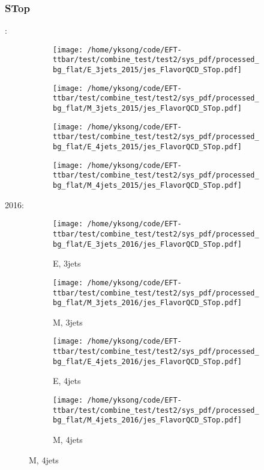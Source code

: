 \documentclass{beamer}
\begin{document}
\begin{frame}
\frametitle{STop}
\fontsize{5}{1}:
\begin{figure}
\centering
\begin{subfigure}[b]{0.24\textwidth}
\texttt{[image: /home/yksong/code/EFT-ttbar/test/combine\_test/test2/sys\_pdf/processed\_bg\_flat/E\_3jets\_2015/jes\_FlavorQCD\_STop.pdf]}
\end{subfigure}
\begin{subfigure}[b]{0.24\textwidth}
\texttt{[image: /home/yksong/code/EFT-ttbar/test/combine\_test/test2/sys\_pdf/processed\_bg\_flat/M\_3jets\_2015/jes\_FlavorQCD\_STop.pdf]}
\end{subfigure}
\begin{subfigure}[b]{0.24\textwidth}
\texttt{[image: /home/yksong/code/EFT-ttbar/test/combine\_test/test2/sys\_pdf/processed\_bg\_flat/E\_4jets\_2015/jes\_FlavorQCD\_STop.pdf]}
\end{subfigure}
\begin{subfigure}[b]{0.24\textwidth}
\texttt{[image: /home/yksong/code/EFT-ttbar/test/combine\_test/test2/sys\_pdf/processed\_bg\_flat/M\_4jets\_2015/jes\_FlavorQCD\_STop.pdf]}
\end{subfigure}
\end{figure}
2016:
\begin{figure}
\centering
\begin{subfigure}[b]{0.24\textwidth}
\texttt{[image: /home/yksong/code/EFT-ttbar/test/combine\_test/test2/sys\_pdf/processed\_bg\_flat/E\_3jets\_2016/jes\_FlavorQCD\_STop.pdf]}
\captionsetup{font=tiny}
\caption{E, 3jets}
\end{subfigure}
\begin{subfigure}[b]{0.24\textwidth}
\texttt{[image: /home/yksong/code/EFT-ttbar/test/combine\_test/test2/sys\_pdf/processed\_bg\_flat/M\_3jets\_2016/jes\_FlavorQCD\_STop.pdf]}
\captionsetup{font=tiny}
\caption{M, 3jets}
\end{subfigure}
\begin{subfigure}[b]{0.24\textwidth}
\texttt{[image: /home/yksong/code/EFT-ttbar/test/combine\_test/test2/sys\_pdf/processed\_bg\_flat/E\_4jets\_2016/jes\_FlavorQCD\_STop.pdf]}
\captionsetup{font=tiny}
\caption{E, 4jets}
\end{subfigure}
\begin{subfigure}[b]{0.24\textwidth}
\texttt{[image: /home/yksong/code/EFT-ttbar/test/combine\_test/test2/sys\_pdf/processed\_bg\_flat/M\_4jets\_2016/jes\_FlavorQCD\_STop.pdf]}
\captionsetup{font=tiny}
\caption{M, 4jets}
\end{subfigure}
\end{figure}
\end{frame}
\end{document}
